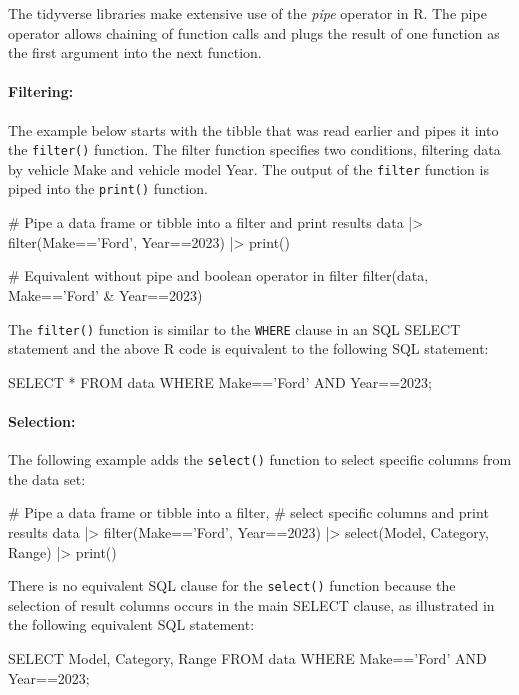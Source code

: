 The tidyverse libraries make extensive use of the \emph{pipe} operator in R. The pipe operator allows chaining of function calls and plugs the result of one function as the first argument into the next function. 

\paragraph*{Filtering:} The example below starts with the tibble that was read earlier and pipes it into the \texttt{filter()} function. The filter function specifies two conditions, filtering data by vehicle Make and vehicle model Year. The output of the \texttt{filter} function is piped into the \texttt{print()} function. 

\begin{Rcode}
# Pipe a data frame or tibble into a filter and print results
data |> 
  filter(Make=='Ford', Year==2023) |> 
  print()

# Equivalent without pipe and boolean operator in filter
filter(data, Make=='Ford' & Year==2023)
\end{Rcode}

The \texttt{filter()} function is similar to the \texttt{WHERE} clause in an SQL SELECT statement and the above R code is equivalent to the following SQL statement:

\begin{sqlcode}
SELECT * 
   FROM data 
   WHERE Make=='Ford' AND Year==2023;
\end{sqlcode}

\paragraph*{Selection:} The following example adds the \texttt{select()} function to select specific columns from the data set:

\begin{Rcode}
# Pipe a data frame or tibble into a filter,
# select specific columns and print results
data |> 
  filter(Make=='Ford', Year==2023) |> 
  select(Model, Category, Range) |>
  print()
\end{Rcode}

There is no equivalent SQL clause for the \texttt{select()} function because the selection of result columns occurs in the main SELECT clause, as illustrated in the following equivalent SQL statement:

\begin{sqlcode}
SELECT Model, Category, Range 
   FROM data 
   WHERE Make=='Ford' AND Year==2023;
\end{sqlcode}

